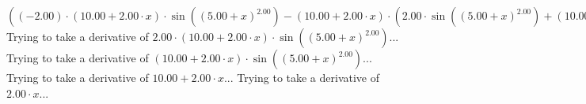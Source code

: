 \documentclass{article}
\begin{document}
$({{\left({-2.00}\right) \cdot {\left({{10.00} + {{2.00} \cdot {x}}}\right) \cdot  \sin {\left({\left({{5.00} + {x}}\right) ^ {2.00}}\right)} }} - {\left({{10.00} + {{2.00} \cdot {x}}}\right) \cdot \left({{{2.00} \cdot  \sin {\left({\left({{5.00} + {x}}\right) ^ {2.00}}\right)} } + {\left({{10.00} + {{2.00} \cdot {x}}}\right) \cdot { \cos {\left({\left({{5.00} + {x}}\right) ^ {2.00}}\right)}  \cdot \left({{10.00} + {{2.00} \cdot {x}}}\right)}}}\right)}})'(x) = {{{\left({-4.00}\right) \cdot  \sin {\left({\left({{5.00} + {x}}\right) ^ {2.00}}\right)} } - {{2.00} \cdot {\left({{10.00} + {{2.00} \cdot {x}}}\right) \cdot { \cos {\left({\left({{5.00} + {x}}\right) ^ {2.00}}\right)}  \cdot \left({{10.00} + {{2.00} \cdot {x}}}\right)}}}} + {{{\left({-4.00}\right) \cdot  \sin {\left({\left({{5.00} + {x}}\right) ^ {2.00}}\right)} } - {{2.00} \cdot {\left({{10.00} + {{2.00} \cdot {x}}}\right) \cdot { \cos {\left({\left({{5.00} + {x}}\right) ^ {2.00}}\right)}  \cdot \left({{10.00} + {{2.00} \cdot {x}}}\right)}}}} - {\left({{10.00} + {{2.00} \cdot {x}}}\right) \cdot \left({{{2.00} \cdot { \cos {\left({\left({{5.00} + {x}}\right) ^ {2.00}}\right)}  \cdot \left({{10.00} + {{2.00} \cdot {x}}}\right)}} + {{{2.00} \cdot { \cos {\left({\left({{5.00} + {x}}\right) ^ {2.00}}\right)}  \cdot \left({{10.00} + {{2.00} \cdot {x}}}\right)}} + {\left({{10.00} + {{2.00} \cdot {x}}}\right) \cdot \left({{\left({-1.00}\right) \cdot {\left({{10.00} + {{2.00} \cdot {x}}}\right) \cdot {\left({{10.00} + {{2.00} \cdot {x}}}\right) \cdot  \sin {\left({\left({{5.00} + {x}}\right) ^ {2.00}}\right)} }}} + {{2.00} \cdot  \cos {\left({\left({{5.00} + {x}}\right) ^ {2.00}}\right)} }}\right)}}}\right)}}}$\newline
\newline
Trying to take a derivative of ${{2.00} \cdot {\left({{10.00} + {{2.00} \cdot {x}}}\right) \cdot  \sin {\left({\left({{5.00} + {x}}\right) ^ {2.00}}\right)} }}$...\newline
\newline
Trying to take a derivative of ${\left({{10.00} + {{2.00} \cdot {x}}}\right) \cdot  \sin {\left({\left({{5.00} + {x}}\right) ^ {2.00}}\right)} }$...\newline
\newline
Trying to take a derivative of ${{10.00} + {{2.00} \cdot {x}}}$...\newline
\newline
Trying to take a derivative of ${{2.00} \cdot {x}}$...\newline
\newline
\end{document}
